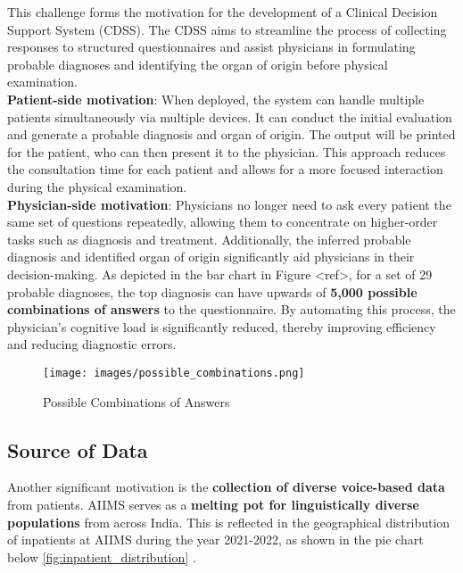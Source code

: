 \noindent This challenge forms the motivation for the development of a Clinical Decision Support System (CDSS). The CDSS aims to streamline the process of collecting responses to structured questionnaires and assist physicians in formulating probable diagnoses and identifying the organ of origin before physical examination.\\[\baselineskip]

\noindent \textcolor{TUMRed}{\textbf{Patient-side motivation}}: When deployed, the system can handle multiple patients simultaneously via multiple devices. It can conduct the initial evaluation and generate a probable diagnosis and organ of origin. The output will be printed for the patient, who can then present it to the physician. This approach reduces the consultation time for each patient and allows for a more focused interaction during the physical examination.\\[\baselineskip]

\noindent \textcolor{TUMRed}{\textbf{Physician-side motivation}}: Physicians no longer need to ask every patient the same set of questions repeatedly, allowing them to concentrate on higher-order tasks such as diagnosis and treatment. Additionally, the inferred probable diagnosis and identified organ of origin significantly aid physicians in their decision-making. As depicted in the bar chart in Figure <ref>, for a set of 29 probable diagnoses, the top diagnosis can have upwards of \textcolor{TUMRed}{\textbf{5,000 possible combinations of answers}} to the questionnaire. By automating this process, the physician's cognitive load is significantly reduced, thereby improving efficiency and reducing diagnostic errors.

\begin{figure}[h]
    \centering
    \texttt{[image: images/possible\_combinations.png]}
    \caption{Possible Combinations of Answers}
    \label{fig:possible_combinations}
\end{figure}

\subsection{Source of Data}
Another significant motivation is the \textcolor{TUMRed}{\textbf{collection of diverse voice-based data}} from patients. AIIMS serves as a \textcolor{TUMRed}{\textbf{melting pot for linguistically diverse populations}} from across India. This is reflected in the geographical distribution of inpatients at AIIMS during the year 2021-2022, as shown in the pie chart below \ref{fig:inpatient_distribution} \cite{AIIMS2024}.\\[\baselineskip]

